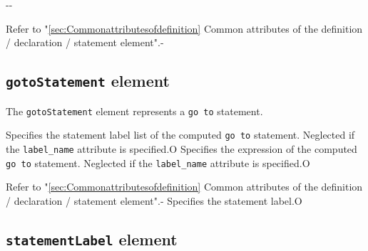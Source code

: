 
\begin{XcodeMLChildElements}
\XcodeMLElementDef{-}
{-}{-}
\end{XcodeMLChildElements}

\begin{XcodeMLAttributes}
{Refer to "\ref{sec:Commonattributesofdefinition} Common attributes of the definition / declaration / statement element".}{-}
\end{XcodeMLAttributes}


\subsection{ {\tt gotoStatement} element}

The {\tt gotoStatement} element represents a {\tt go to} statement.


\begin{XcodeMLChildElements}
{Specifies the statement label list of the computed {\tt go to} statement.
 Neglected if the {\tt label\_name} attribute is specified.}{O}
{Specifies the expression of the computed {\tt go to} statement.
 Neglected if the {\tt label\_name} attribute is specified.}{O}
\end{XcodeMLChildElements}

\begin{XcodeMLAttributes}
{Refer to "\ref{sec:Commonattributesofdefinition} Common attributes of the definition / declaration / statement element".}{-}
{Specifies the statement label.}{O}
\end{XcodeMLAttributes}


\subsection{ {\tt statementLabel} element}

